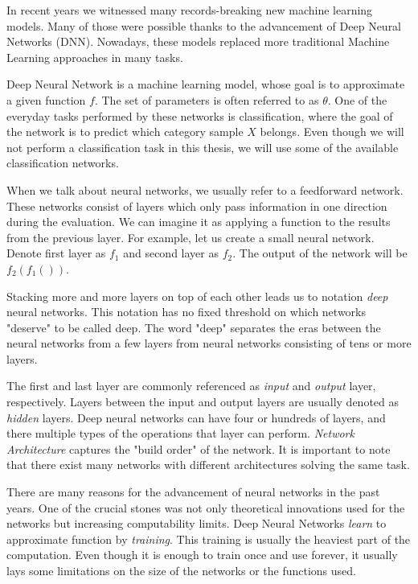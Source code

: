 In recent years we witnessed many records-breaking new machine learning models. Many of those were possible thanks to the advancement of Deep Neural Networks (DNN). Nowadays, these models replaced more traditional Machine Learning approaches in many tasks.

Deep Neural Network is a machine learning model, whose goal is to approximate a given function \(f\). The set of parameters is often referred to as \(\theta\). One of the everyday tasks performed by these networks is classification, where the goal of the network is to predict which category sample \(X\) belongs. Even though we will not perform a classification task in this thesis, we will use some of the available classification networks.

When we talk about neural networks, we usually refer to a feedforward network. These networks consist of layers which only pass information in one direction during the evaluation. We can imagine it as applying a function to the results from the previous layer. For example, let us create a small neural network. Denote first layer as \(f_1\) and second layer as \(f_2\). The output of the network will be \(f_2\left(f_1\left(\right)\right)\).

Stacking more and more layers on top of each other leads us to notation \emph{deep} neural networks. This notation has no fixed threshold on which networks "deserve" to be called deep. The word "deep" separates the eras between the neural networks from a few layers from neural networks consisting of tens or more layers.  

The first and last layer are commonly referenced as \emph{input} and \emph{output} layer, respectively. Layers between the input and output layers are usually denoted as \emph{hidden} layers. Deep neural networks can have four or hundreds of layers, and there multiple types of the operations that layer can perform. \emph{Network Architecture} captures the "build order" of the network. It is important to note that there exist many networks with different architectures solving the same task.

There are many reasons for the advancement of neural networks in the past years. One of the crucial stones was not only theoretical innovations used for the networks but increasing computability limits. Deep Neural Networks \emph{learn} to approximate function by \emph{training}. This training is usually the heaviest part of the computation. Even though it is enough to train once and use forever, it usually lays some limitations on the size of the networks or the functions used.

